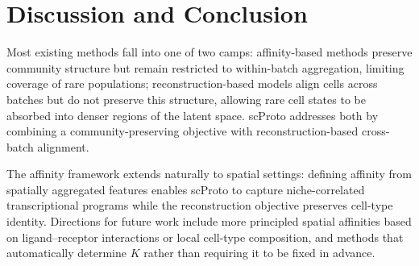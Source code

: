 \section{Discussion and Conclusion}

Most existing methods fall into one of two camps: affinity-based methods preserve community structure but remain restricted to within-batch aggregation, limiting coverage of rare populations; reconstruction-based models align cells across batches but do not preserve this structure, allowing rare cell states to be absorbed into denser regions of the latent space. scProto addresses both by combining a community-preserving objective with reconstruction-based cross-batch alignment.

The affinity framework extends naturally to spatial settings: defining affinity from spatially aggregated features enables scProto to capture niche-correlated transcriptional programs while the reconstruction objective preserves cell-type identity. Directions for future work include more principled spatial affinities based on ligand--receptor interactions or local cell-type composition, and methods that automatically determine $K$ rather than requiring it to be fixed in advance.
